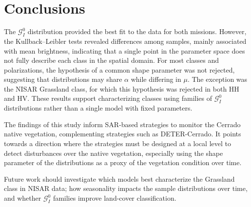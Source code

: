 \section{Conclusions}

The $\mathcal G^0_I$ distribution provided the best fit to the data for both missions.
However, the Kullback--Leibler tests revealed differences among samples, mainly associated with mean brightness, indicating that a single point in the parameter space does not fully describe each class in the spatial domain.
For most classes and polarizations, the hypothesis of a common shape parameter was not rejected, suggesting that distributions may share $\alpha$ while differing in $\mu$.
The exception was the NISAR Grassland class, for which this hypothesis was rejected in both HH and HV.
These results support characterizing classes using families of $\mathcal G^0_I$ distributions rather than a single model with fixed parameters.

The findings of this study inform SAR-based strategies to monitor the Cerrado native vegetation, complementing strategies such as DETER-Cerrado.
It points towards a direction where the strategies must be designed at a local level to detect disturbances over the native vegetation, especially using the shape parameter of the distributions as a proxy of the vegetation condition over time.

Future work should investigate which models best characterize the Grassland class in NISAR data; how seasonality impacts the sample distributions over time, and whether $\mathcal G^0_I$ families improve land-cover classification.
